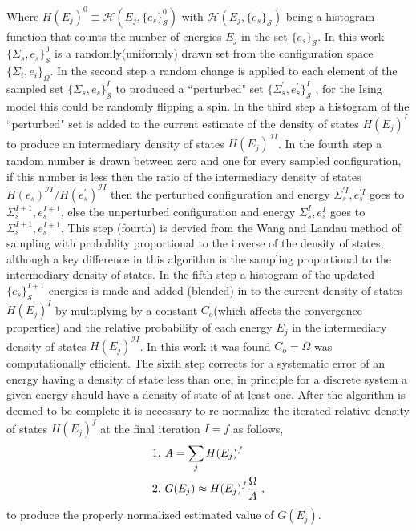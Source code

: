 \documentclass[aps,prl,reprint,superscriptaddress,showkeys]{revtex4-1}
\begin{document}
Where  $H(E_j)^0 \equiv \mathcal{H}(E_j,\{e_s\}_{\mathcal{S}}^0)$ with $\mathcal{H}(E_j,\{e_s\}_{\mathcal{S}})$ being a histogram function that counts the number of energies $E_j$ in the set $\{e_s\}_{\mathcal{S}}$. In this work $\{\Sigma_{s},e_s\}_{\mathcal{S}}^0$  is a randomly(uniformly) drawn set from the configuration space $\{ \Sigma_i, e_i \}_\Omega $. In the second step  a random change is applied to each element of the sampled set $\{\Sigma_{s},e_s\}_{\mathcal{S}}^I$ to produced a ``perturbed" set $ \{\Sigma_{s}^{'},e_s^{'}\}_{\mathcal{S}}^I$ , for the Ising model this could be randomly flipping a spin. In the third step a histogram of the ``perturbed" set is added to the current estimate of the density of states $H(E_j)^I$ to produce an intermediary density of states $H(E_j)^{\mathcal{I}I}$. In the fourth step a random number is drawn between zero and one for every sampled configuration, if this number is less then the ratio of the intermediary density of states $H(e_s)^{\mathcal{I}I}/H(e_s^{'})^{\mathcal{I}I}$ then the perturbed configuration and energy  $\Sigma_{s}^{'I},e_s^{'I}$  goes to $\Sigma_{s}^{I+1},e_s^{I+1}$,  else the unperturbed configuration and energy $\Sigma_{s}^{I},e_s^I$  goes to $\Sigma_{s}^{I+1},e_s^{I+1}$. This step (fourth) is dervied from the Wang and Landau method of sampling with probablity proportional to the inverse of the density of states, although a key difference in this algorithm is the sampling proportional to the intermediary density of states.  In the fifth step a histogram of the updated $\{ e_s \}^{I+1}_{\mathcal{S}}$ energies is made and added (blended) in to the current density of states $H(E_j)^I$   by multiplying  by a constant $C_{o}$(which affects the convergence properties) and the relative probability of each energy $E_j$ in the  intermediary density of states $H(E_j)^{\mathcal{I}I}$. In this work it was found  $C_{o}=\Omega$ was computationally efficient. The sixth step corrects for a systematic error of an energy having a density of state less than one, in principle for a discrete system a given energy should have a density of state of at least one.  After the algorithm is deemed to be complete it is necessary to re-normalize the iterated relative density of states $H(E_j)^f$ at the final iteration $I=f$ as follows, 
\begin{equation}
\begin{split}
&1. \hspace{0.125cm} A = \sum_jH(E_j)^f\\
&2. \hspace{0.125cm} G(E_j)\approx H(E_j)^f \frac{\Omega}{A} \;,
\end{split}
\end{equation}
to produce the properly normalized estimated value of $G(E_j)$. 
\end{document}
